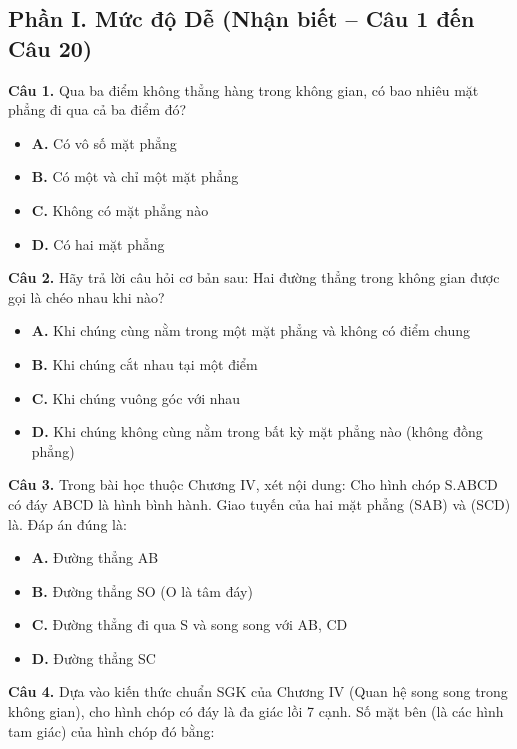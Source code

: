 \documentclass[11pt,a4paper]{article}
\begin{document}
\subsection*{\color{accent} Phần I. Mức độ Dễ (Nhận biết -- Câu 1 đến Câu 20)}
\textbf{\color{primary} Câu 1.} Qua ba điểm không thẳng hàng trong không gian, có bao nhiêu mặt phẳng đi qua cả ba điểm đó?\par
\begin{itemize}\setlength{\itemsep}{1pt}\setlength{\parskip}{0pt}
  \item[] \textbf{A.} Có vô số mặt phẳng
  \item[] \textbf{B.} Có một và chỉ một mặt phẳng
  \item[] \textbf{C.} Không có mặt phẳng nào
  \item[] \textbf{D.} Có hai mặt phẳng
\end{itemize}\vspace{2pt}
\textbf{\color{primary} Câu 2.} Hãy trả lời câu hỏi cơ bản sau: Hai đường thẳng trong không gian được gọi là chéo nhau khi nào?\par
\begin{itemize}\setlength{\itemsep}{1pt}\setlength{\parskip}{0pt}
  \item[] \textbf{A.} Khi chúng cùng nằm trong một mặt phẳng và không có điểm chung
  \item[] \textbf{B.} Khi chúng cắt nhau tại một điểm
  \item[] \textbf{C.} Khi chúng vuông góc với nhau
  \item[] \textbf{D.} Khi chúng không cùng nằm trong bất kỳ mặt phẳng nào (không đồng phẳng)
\end{itemize}\vspace{2pt}
\textbf{\color{primary} Câu 3.} Trong bài học thuộc Chương IV, xét nội dung: Cho hình chóp S.ABCD có đáy ABCD là hình bình hành. Giao tuyến của hai mặt phẳng (SAB) và (SCD) là. Đáp án đúng là:\par
\begin{itemize}\setlength{\itemsep}{1pt}\setlength{\parskip}{0pt}
  \item[] \textbf{A.} Đường thẳng AB
  \item[] \textbf{B.} Đường thẳng SO (O là tâm đáy)
  \item[] \textbf{C.} Đường thẳng đi qua S và song song với AB, CD
  \item[] \textbf{D.} Đường thẳng SC
\end{itemize}\vspace{2pt}
\textbf{\color{primary} Câu 4.} Dựa vào kiến thức chuẩn SGK của Chương IV (Quan hệ song song trong không gian), cho hình chóp có đáy là đa giác lồi 7 cạnh. Số mặt bên (là các hình tam giác) của hình chóp đó bằng:\par
\end{document}
